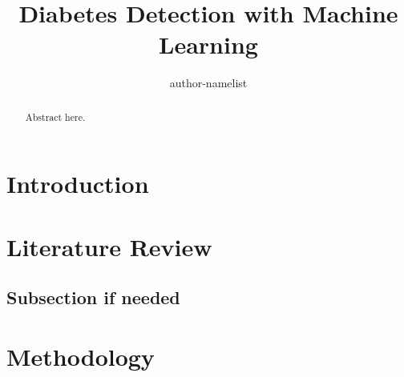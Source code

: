 \documentclass{article}
\title{Diabetes Detection with Machine Learning}
\author{author-namelist}
\begin{document}
\maketitle

\begin{abstract}
Abstract here.
\end{abstract}

\section{Introduction}


\section{Literature Review}


\subsection{Subsection if needed}

\section{Methodology}
\end{document}
